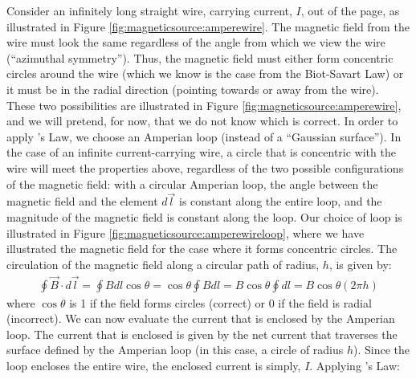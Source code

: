 Consider an infinitely long straight wire, carrying current, $I$, out of the page, as illustrated in Figure \ref{fig:magneticsource:amperewire}. The magnetic field from the wire must look the same regardless of the angle from which we view the wire (``azimuthal symmetry''). Thus, the magnetic field must either form concentric circles around the wire (which we know is the case from the Biot-Savart Law) or it must be in the radial direction (pointing towards or away from the wire). These two possibilities are illustrated in Figure \ref{fig:magneticsource:amperewire}, and we will pretend, for now, that we do not know which is correct.
In order to apply \ampere's Law, we choose an Amperian loop (instead of a ``Gaussian surface''). In the case of an infinite current-carrying wire, a circle that is concentric with the wire will meet the properties above, regardless of the two possible configurations of the magnetic field: with a circular Amperian loop, the angle between the magnetic field and the element $d\vec l$ is constant along the entire loop, and the magnitude of the magnetic field is constant along the loop. Our choice of loop is illustrated in Figure \ref{fig:magneticsource:amperewireloop}, where we have illustrated the magnetic field for the case where it forms concentric circles. 
The circulation of the magnetic field along a circular path of radius, $h$, is given by:
\begin{align*}
\oint  \vec B \cdot d\vec l = \oint B dl \cos\theta = \cos\theta \oint B dl=B\cos\theta \oint dl=B\cos\theta (2\pi h)
\end{align*}
where $\cos\theta$ is 1 if the field forms circles (correct) or 0 if the field is radial (incorrect). We can now evaluate the current that is enclosed by the Amperian loop. The current that is enclosed is given by the net current that traverses the surface defined by the Amperian loop (in this case, a circle of radius $h$). Since the loop encloses the entire wire, the enclosed current is simply, $I$. Applying \ampere's Law:
